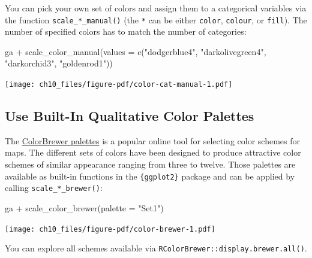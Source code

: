 \documentclass[
  letterpaper,
]{scrbook}
\newenvironment{Shaded}{\begin{snugshade}}{\end{snugshade}}
\newcommand{\AttributeTok}[1]{\textcolor[rgb]{0.40,0.45,0.13}{#1}}
\newcommand{\FunctionTok}[1]{\textcolor[rgb]{0.28,0.35,0.67}{#1}}
\newcommand{\NormalTok}[1]{\textcolor[rgb]{0.00,0.23,0.31}{#1}}
\newcommand{\SpecialCharTok}[1]{\textcolor[rgb]{0.37,0.37,0.37}{#1}}
\newcommand{\StringTok}[1]{\textcolor[rgb]{0.13,0.47,0.30}{#1}}
\begin{document}
You can pick your own set of colors and assign them to a categorical
variables via the function \texttt{scale\_*\_manual()} (the \texttt{*}
can be either \texttt{color}, \texttt{colour}, or \texttt{fill}). The
number of specified colors has to match the number of categories:

\begin{Shaded}
\begin{Highlighting}[]
\NormalTok{ga }\SpecialCharTok{+} \FunctionTok{scale\_color\_manual}\NormalTok{(}\AttributeTok{values =} \FunctionTok{c}\NormalTok{(}\StringTok{"dodgerblue4"}\NormalTok{,}
                                   \StringTok{"darkolivegreen4"}\NormalTok{,}
                                   \StringTok{"darkorchid3"}\NormalTok{,}
                                   \StringTok{"goldenrod1"}\NormalTok{))}
\end{Highlighting}
\end{Shaded}

\texttt{[image: ch10\_files/figure-pdf/color-cat-manual-1.pdf]}

\subsection{Use Built-In Qualitative Color
Palettes}\label{use-built-in-qualitative-color-palettes}

The \href{http://colorbrewer2.org/}{ColorBrewer palettes} is a popular
online tool for selecting color schemes for maps. The different sets of
colors have been designed to produce attractive color schemes of similar
appearance ranging from three to twelve. Those palettes are available as
built-in functions in the \texttt{\{ggplot2\}} package and can be
applied by calling \texttt{scale\_*\_brewer()}:

\begin{Shaded}
\begin{Highlighting}[]
\NormalTok{ga }\SpecialCharTok{+} \FunctionTok{scale\_color\_brewer}\NormalTok{(}\AttributeTok{palette =} \StringTok{"Set1"}\NormalTok{)}
\end{Highlighting}
\end{Shaded}

\texttt{[image: ch10\_files/figure-pdf/color-brewer-1.pdf]}

\begin{tcolorbox}[enhanced jigsaw, rightrule=.15mm, arc=.35mm, title=\textcolor{quarto-callout-note-color}{\faInfo}\hspace{0.5em}{Note}, colback=white, toptitle=1mm, colbacktitle=quarto-callout-note-color!10!white, breakable, left=2mm, opacityback=0, leftrule=.75mm, bottomrule=.15mm, bottomtitle=1mm, colframe=quarto-callout-note-color-frame, coltitle=black, toprule=.15mm, opacitybacktitle=0.6, titlerule=0mm]

You can explore all schemes available via
\texttt{RColorBrewer::display.brewer.all()}.

\end{tcolorbox}
\end{document}
